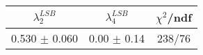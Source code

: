 \begin{tabular}{c|c||c}
$\lambda_{2}^{LSB}$ & $\lambda_4^{LSB}$ & $\chi^{2}$/ndf \\
\hline
0.530 $\pm$ 0.060 & 0.00 $\pm$ 0.14 & 238/76\\
\end{tabular}
